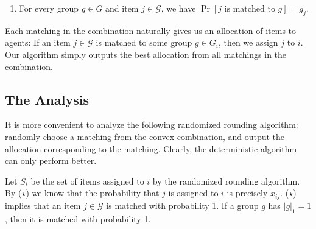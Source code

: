 \documentclass[10pt,a4paper]{article}
\theoremstyle{definition}
\theoremstyle{plain}
\newcommand\calG{{\mathcal{G}}}
\begin{document}
    \begin{enumerate}[label = ($\star$)]
        \item For every group $g \in G$ and item $j \in \calG$, we have $\Pr[j\text{ is matched to }g] = g_j$.
    \end{enumerate}

    Each matching in the combination naturally gives us an allocation of items to agents: If an item $j \in \calG$ is matched to some group $g \in G_i$, then we assign $j$ to $i$.  Our algorithm simply outputs the best allocation from all matchings in the combination.  
    

\subsection{The Analysis} \label{sec:analysis}
    It is more convenient to analyze the following randomized rounding algorithm: randomly choose a matching from the convex combination, and output the allocation corresponding to the matching. Clearly, the deterministic algorithm can only perform better. 


    Let $S_i$ be the set of items assigned to $i$ by the randomized rounding algorithm. By ($\star$) we know that the probability that $j$ is assigned to $i$ is precisely $x_{ij}$. ($\star$) implies that an item $j \in \calG$ is matched with probability 1. If a group $g$ has $|g|_1 = 1$, then it is matched with probability 1.
\end{document}
